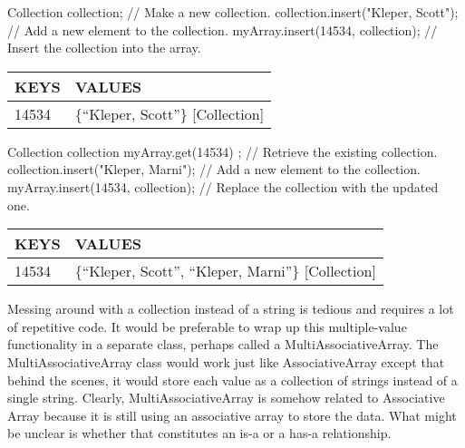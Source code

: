 \begin{cpp}
Collection collection; // Make a new collection.
collection.insert("Kleper, Scott"); // Add a new element to the collection.
myArray.insert(14534, collection); // Insert the collection into the array.
\end{cpp}

\begin{longtable}{|l|l|}
\hline
\textbf{KEYS} & \textbf{VALUES}                      \\ \hline
\endfirsthead
%
\endhead
%
14534         & \{“Kleper, Scott”\} {[}Collection{]} \\ \hline
\end{longtable}

\begin{cpp}
Collection collection { myArray.get(14534) }; // Retrieve the existing collection.
collection.insert("Kleper, Marni"); // Add a new element to the collection.
myArray.insert(14534, collection); // Replace the collection with the updated one.
\end{cpp}

\begin{longtable}{|l|l|}
\hline
\textbf{KEYS} & \textbf{VALUES}                                       \\ \hline
\endfirsthead
%
\endhead
%
14534         & \{“Kleper, Scott”, “Kleper, Marni”\} {[}Collection{]} \\ \hline
\end{longtable}

Messing around with a collection instead of a string is tedious and requires a lot of repetitive code. It would be preferable to wrap up this multiple-value functionality in a separate class, perhaps called a MultiAssociativeArray. The MultiAssociativeArray class would work just like AssociativeArray except that behind the scenes, it would store each value as a collection of strings instead of a single string. Clearly, MultiAssociativeArray is somehow related to Associative Array because it is still using an associative array to store the data. What might be unclear is whether that constitutes an is-a or a has-a relationship.

